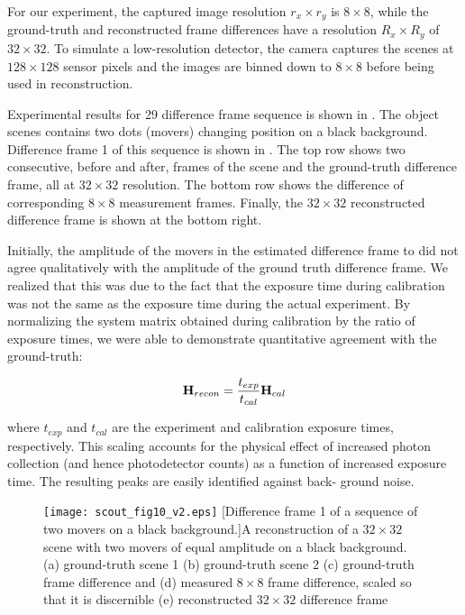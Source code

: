 For our experiment, the captured image resolution $r_x \times r_y$ is $8 \times 8$, while the ground-truth and reconstructed frame differences have a resolution $R_x \times R_y$ of $32 \times 32$. To simulate a low-resolution detector, the camera captures the scenes at $128 \times 128$ sensor pixels and the images are binned down to $8 \times 8$ before being used in reconstruction. 

Experimental results for 29 difference frame sequence is shown in . The object scenes contains two dots (movers) changing position on a black background. Difference frame 1 of this sequence is shown in . The top row shows two consecutive, before and after, frames of the scene and the ground-truth difference frame, all at $32 \times 32$ resolution. The bottom row shows the difference of corresponding $8 \times 8$ measurement frames. Finally, the $32 \times 32$ reconstructed difference frame is shown at the bottom right. 

Initially, the amplitude of the movers in the estimated difference frame to did not agree qualitatively with the amplitude of the ground truth difference frame. We realized that this was due to the fact that the exposure time during calibration was not the same as the exposure time during the actual experiment. By normalizing the system matrix obtained during calibration by the ratio of exposure times, we were able to demonstrate quantitative agreement with the ground-truth:

\begin{equation}
	\mathbf{H}_{recon} = \frac{t_{exp}}{t_{cal}} \mathbf{H}_{cal}
	\label{eq:ScoutCalibrationMatrixScaling}
\end{equation}

where $t_{exp}$ and $t_{cal}$ are the experiment and calibration exposure times, respectively. This scaling accounts for the physical effect of increased photon collection (and hence photodetector counts) as a function of increased exposure time. The resulting peaks are easily identified against back- ground noise.

\begin{figure}
	\centering
	\texttt{[image: scout\_fig10\_v2.eps]}
	[Difference frame 1 of a sequence of two movers on a black background.]{A reconstruction of a $32 \times 32$ scene with two movers of equal amplitude on a black background. (a) ground-truth scene 1 (b) ground-truth scene 2 (c) ground-truth frame difference and (d) measured $8 \times 8$ frame difference, scaled so that it is discernible (e) reconstructed $32 \times 32$ difference frame}
	\label{fig:scout_fig10_un}
\end{figure}

